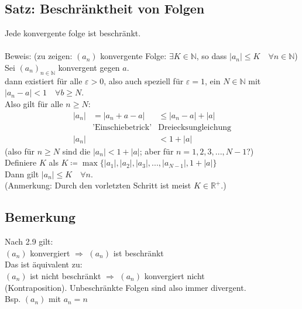 \documentclass[12pt, titlepage]{article}
\newcommand{\R}{\mathds{R}}
\newcommand{\N}{\mathds{N}}
\renewcommand{\>}{\rightarrow}
\renewcommand{\*}{\cdot}
\renewcommand{\epsilon}{\varepsilon}
\begin{document}
	\subsection{Satz: Beschränktheit von Folgen}
	Jede konvergente folge ist beschränkt.\\
	\\
	Beweis: (zu zeigen: $(a_n)$ konvergente Folge: $\exists K\in\N$, so dass $|a_n|\leq K\quad\forall n\in\N$)\\
	Sei $(a_n)_{n\in\N}$ konvergent gegen $a$.\\
	dann existiert für alle $\epsilon>0$, also auch speziell für $\epsilon=1$, ein $N\in\N$ mit $|a_n-a|<1\quad\forall b\geq N$.\\
	Also gilt für alle $n\geq N$:\\
	\begin{align*}
		|a_n|&=|a_n+a-a|&\leq |a_n-a|+|a|\\
		&\textrm{'Einschiebetrick'} &\textrm{Dreiecksungleichung}\\
		|a_n|&&<1+|a|
	\end{align*}
	(also für $n\geq N$ sind die $|a_n|<1+|a|$; aber für $n=1,2,3,..., N-1$?)\\
	Definiere $K$ als $K\coloneqq\max\{|a_1|,|a_2|,|a_3|,...,|a_{N-1}|,1+|a|\}$\\
	Dann gilt $|a_n|\leq K\quad\forall n$.\\
	(Anmerkung: Durch den vorletzten Schritt ist meist $K\in\R^+$.)\\
	\subsection{Bemerkung}
	Nach 2.9 gilt:\\
	 $(a_n)$ konvergiert $\Rightarrow$ $(a_n)$ ist beschränkt\\
	Das ist äquivalent zu:\\
	$(a_n)$ ist nicht beschränkt $\Rightarrow$ $(a_n)$ konvergiert nicht\\
	(Kontraposition). Unbeschränkte Folgen sind also immer divergent.\\
	Bsp. $(a_n)$ mit $a_n=n$
\end{document}
